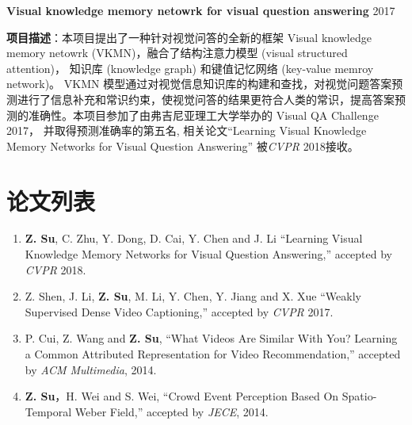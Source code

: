 \documentclass[margin,line]{res}
\begin{document}
\begin{resume}
	\textbf{Visual knowledge memory netowrk for visual question answering} \hfill{2017}
	\begin{description}
		\item \textbf{项目描述}：本项目提出了一种针对视觉问答的全新的框架 Visual knowledge memory netowrk (VKMN)，融合了结构注意力模型 (visual structured attention)， 知识库 (knowledge graph) 和键值记忆网络 (key-value memroy network)。 VKMN 模型通过对视觉信息知识库的构建和查找，对视觉问题答案预测进行了信息补充和常识约束，使视觉问答的结果更符合人类的常识，提高答案预测的准确性。本项目参加了由弗吉尼亚理工大学举办的 Visual QA Challenge 2017， 并取得预测准确率的第五名, 相关论文``Learning Visual Knowledge Memory Networks for Visual Question Answering'' 被\emph{CVPR} 2018接收。
	\end{description}


	\section{\sc 论文列表}
	\begin{enumerate}[leftmargin=*]
		\item \textbf{Z. Su},  C. Zhu, Y. Dong, D. Cai, Y. Chen and J. Li ``Learning Visual Knowledge Memory Networks for Visual Question Answering,'' accepted by \emph{CVPR} 2018.

		\item Z. Shen, J. Li, \textbf{Z. Su},  M. Li, Y. Chen, Y. Jiang and X. Xue ``Weakly Supervised Dense Video Captioning,'' accepted by \emph{CVPR} 2017.

		\item P. Cui, Z. Wang and \textbf{Z. Su}, ``What Videos Are Similar With You? Learning a Common Attributed Representation for Video Recommendation,'' accepted by \emph{ACM Multimedia}, 2014.

		\item \textbf{Z. Su}，H. Wei and S. Wei, ``Crowd Event Perception Based On Spatio-Temporal Weber Field,'' accepted by \emph{JECE}, 2014.

	\end{enumerate}


\end{resume}
\end{document}
